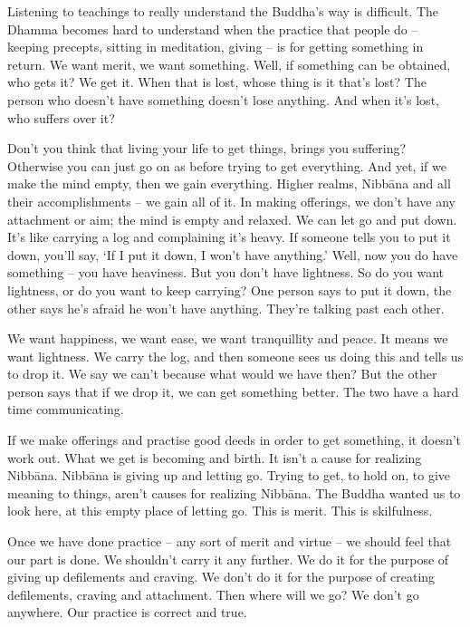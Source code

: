 Listening to teachings to really understand the Buddha's way is difficult. The Dhamma becomes hard to understand when the practice that people do -- keeping precepts, sitting in meditation, giving -- is for getting something in return. We want merit, we want something. Well, if something can be obtained, who gets it? We get it. When that is lost, whose thing is it that's lost? The person who doesn't have something doesn't lose anything. And when it's lost, who suffers over it? 

Don't you think that living your life to get things, brings you suffering? Otherwise you can just go on as before trying to get everything. And yet, if we make the mind empty, then we gain everything. Higher realms, Nibb\=ana and all their accomplishments -- we gain all of it. In making offerings, we don't have any attachment or aim; the mind is empty and relaxed. We can let go and put down. It's like carrying a log and complaining it's heavy. If someone tells you to put it down, you'll say, `If I put it down, I won't have anything.' Well, now you do have something -- you have heaviness. But you don't have lightness. So do you want lightness, or do you want to keep carrying? One person says to put it down, the other says he's afraid he won't have anything. They're talking past each other. 

We want happiness, we want ease, we want tranquillity and peace. It means we want lightness. We carry the log, and then someone sees us doing this and tells us to drop it. We say we can't because what would we have then? But the other person says that if we drop it, we can get something better. The two have a hard time communicating. 

If we make offerings and practise good deeds in order to get something, it doesn't work out. What we get is becoming and birth. It isn't a cause for realizing Nibb\=ana. Nibb\=ana is giving up and letting go. Trying to get, to hold on, to give meaning to things, aren't causes for realizing Nibb\=ana. The Buddha wanted us to look here, at this empty place of letting go. This is merit. This is skilfulness. 

Once we have done practice -- any sort of merit and virtue -- we should feel that our part is done. We shouldn't carry it any further. We do it for the purpose of giving up defilements and craving. We don't do it for the purpose of creating defilements, craving and attachment. Then where will we go? We don't go anywhere. Our practice is correct and true. 

